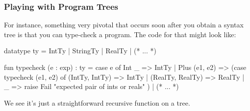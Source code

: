 \documentclass[aspectratio=169]{beamer}
\begin{document}
\begin{frame}[fragile]
  \frametitle{Playing with Program Trees}

  For instance, something very pivotal that occurs soon after you obtain
  a syntax tree is that you can type-check a program. The code for that
  might look like:

  {\small
  \begin{codeblock}
    datatype ty = IntTy | StringTy | RealTy | (* ... *)

    fun typecheck (e : exp) : ty =
      case e of
        Int _ => IntTy
      | Plus (e1, e2) =>
          (case typecheck (e1, e2) of
            (IntTy, IntTy) => IntTy
          | (RealTy, RealTy) => RealTy
          | _ => raise Fail "expected pair of ints or reals"
          )
      | (* ... *)
  \end{codeblock}
  }

  \vspace{\fill}

  We see it's just a straightforward recursive function on a tree.
\end{frame}
\end{document}
